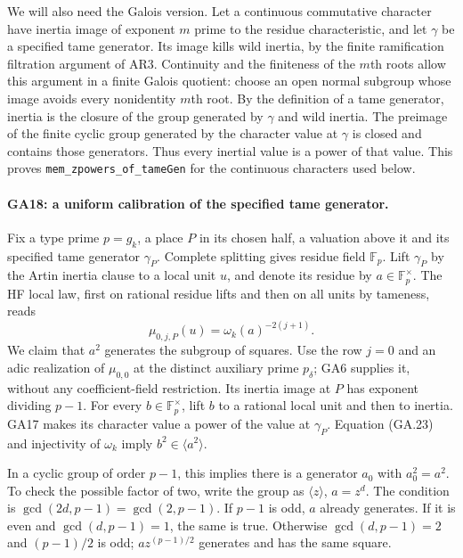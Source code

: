 We will also need the Galois version. Let a continuous
commutative character have inertia image of exponent
$m$ prime to the residue characteristic, and let $\gamma$
be a specified tame generator. Its image kills wild
inertia, by the finite ramification filtration argument
of AR3. Continuity and the finiteness of the $m$th roots
allow this argument in a finite Galois quotient: choose
an open normal subgroup whose image avoids every
nonidentity $m$th root. By the definition of a tame
generator, inertia is the closure of the group generated
by $\gamma$ and wild inertia. The preimage of the finite
cyclic group generated by the character value at $\gamma$
is closed and contains those generators. Thus every
inertial value is a power of that value. This proves
\texttt{mem\_zpowers\_of\_tameGen} for the continuous
characters used below.

\paragraph{GA18: a uniform calibration of the specified tame generator.}
Fix a type prime $p=g_k$, a place $P$ in its chosen half,
a valuation above it and its specified tame generator
$\gamma_P$. Complete splitting gives residue field
$\mathbb F_p$. Lift $\gamma_P$ by the Artin inertia
clause to a local unit $u$, and denote its residue by
$a\in\mathbb F_p^\times$. The HF local law, first on
rational residue lifts and then on all units by tameness,
reads
\[
 \mu_{0,j,P}(u)=\omega_k(a)^{-2(j+1)}.                  \tag{GA.23}
\]
We claim that $a^2$ generates the subgroup of squares.
Use the row $j=0$ and an adic realization of $\mu_{0,0}$
at the distinct auxiliary prime $p_\delta$; GA6 supplies
it, without any coefficient-field restriction. Its
inertia image at $P$ has exponent dividing $p-1$.
For every $b\in\mathbb F_p^\times$, lift $b$ to a rational
local unit and then to inertia. GA17 makes its character
value a power of the value at $\gamma_P$. Equation
(GA.23) and injectivity of $\omega_k$ imply
$b^2\in\langle a^2\rangle$.

In a cyclic group of order $p-1$, this implies there is a
generator $a_0$ with $a_0^2=a^2$. To check the possible
factor of two, write the group as $\langle z\rangle$,
$a=z^d$. The condition is
$\gcd(2d,p-1)=\gcd(2,p-1)$.
If $p-1$ is odd, $a$ already generates.
If it is even and $\gcd(d,p-1)=1$, the same is true.
Otherwise $\gcd(d,p-1)=2$ and $(p-1)/2$ is odd;
$a z^{(p-1)/2}$ generates and has the same square.

